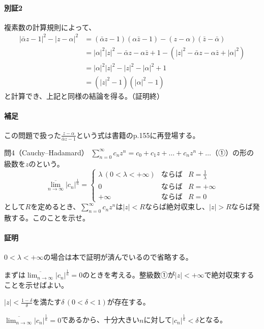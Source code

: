 \paragraph{別証2}
複素数の計算規則によって、
\begin{align*}
    |\bar{\alpha}z-1|^2-|z-\alpha|^2
    &=(\bar{\alpha}z-1)(\alpha\bar{z}-1)-(z-\alpha)(\bar{z}-\bar{\alpha})\\
    &=|\alpha|^2|z|^2-\bar{\alpha}z-\alpha\bar{z}+1-(|z|^2-\bar{\alpha}z-\alpha\bar{z}+|\alpha|^2)\\
    &=|\alpha|^2|z|^2-|z|^2-|\alpha|^2+1\\
    &=(|z|^2-1)(|\alpha|^2-1)
\end{align*}
と計算でき、上記と同様の結論を得る。（証明終）

\paragraph{補足}
この問題で扱った$\frac{z-\alpha}{\bar{\alpha}z-1}$という式は書籍のp.155に再登場する。

\begin{mysimplebox}{問4（Cauchy--Hadamard）}
    $\sum_{n=0}^\infty c_nz^n=c_0+c_1z+\dots+c_nz^n+\dots$（①）の形の級数を$z$のという。
    \[\overline{\lim_{n\to\infty}}|c_n|^{\frac{1}{n}}=\left\{\begin{array}{lll}
      \lambda  \,(0<\lambda<+\infty) & \mbox{ならば} & R=\frac{1}{\lambda}\\
      0 & \mbox{ならば} & R=+\infty\\
      +\infty & \mbox{ならば} & R=0
    \end{array}\right.\]
    として$R$を定めるとき、$\sum_{n=0}^\infty c_nz^n$は$|z|<R$ならば絶対収束し、$|z|>R$ならば発散する。このことを示せ。
\end{mysimplebox}
\paragraph{証明}
$0<\lambda<+\infty$の場合は本で証明が済んでいるので省略する。

まずは$\displaystyle\overline{\lim_{n\to\infty}}|c_n|^{\frac{1}{n}}=0$のときを考える。整級数①が$|z|<+\infty$で絶対収束することを示せばよい。

$|z|<\frac{1-\delta}{\delta}$を満たす$\delta\,(0<\delta<1)$が存在する。

$\displaystyle\overline{\lim_{n\to\infty}}|c_n|^{\frac{1}{n}}=0$であるから、十分大きい$n$に対して$|c_n|^\frac{1}{n}<\delta$となる。

